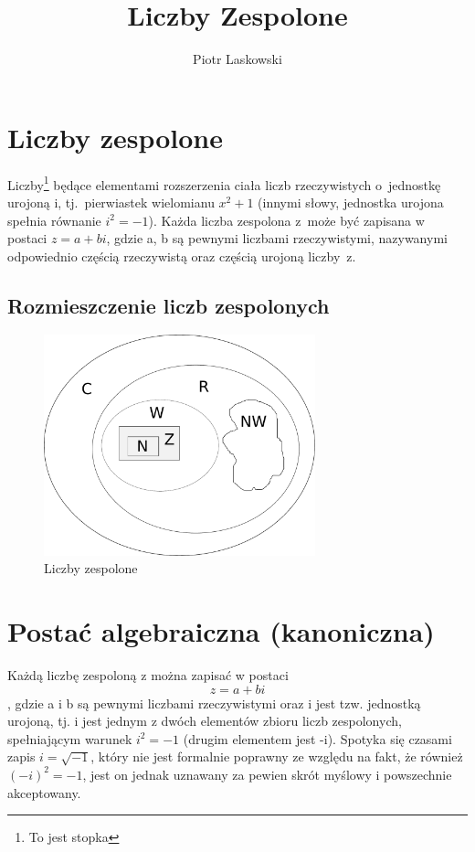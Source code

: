 \documentclass[a4paper,11pt]{article}
\author{Piotr Laskowski}
\title{Liczby Zespolone}
\begin{document}
\maketitle
\newpage
\tableofcontents
\section{Liczby zespolone}
 Liczby\footnote{To jest stopka} będące elementami rozszerzenia ciała liczb rzeczywistych o~jednostkę urojoną i, tj.~pierwiastek wielomianu $x^2+1$ (innymi słowy, jednostka urojona spełnia równanie $i^2 = -1$). Każda liczba zespolona z~może być zapisana w postaci $z=a + bi$, gdzie a, b są pewnymi liczbami rzeczywistymi, nazywanymi odpowiednio częścią rzeczywistą oraz częścią urojoną liczby~z.
\subsection{Rozmieszczenie liczb zespolonych}
\begin{figure}[htbp]
	\centering
		\includegraphics[width=0.70\textwidth]{drawing.pdf}
	\caption{Liczby zespolone}
	\label{fig:rozm}
\end{figure}

\section{Postać algebraiczna (kanoniczna)}
Każdą liczbę zespoloną z można zapisać w postaci $$z=a+bi$$, gdzie a i b są pewnymi liczbami rzeczywistymi oraz i jest tzw. jednostką urojoną, tj. i jest jednym z dwóch elementów zbioru liczb zespolonych, spełniającym warunek $i^2=-1$ (drugim elementem jest -i). Spotyka się czasami zapis $i=\sqrt{-1}$, który nie jest formalnie poprawny ze względu na fakt, że również $(-i)^2=-1$, jest on jednak uznawany za pewien skrót myślowy i powszechnie akceptowany.
\end{document}
